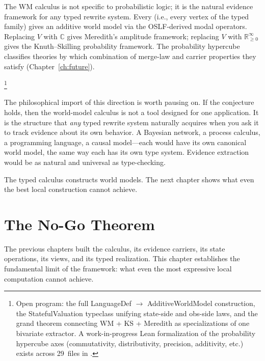 \documentclass[11pt,openany]{report}
\begin{document}
\begin{conjecture}
The WM calculus is not specific to probabilistic logic; it is the
natural evidence framework for any typed rewrite system.  Every
 (i.e., every vertex
of the typed family) gives an additive world model via the
OSLF-derived modal operators.  Replacing $V$ with $\mathbb{C}$ gives
Meredith's amplitude framework; replacing $V$ with
$\mathbb{R}_{\ge 0}^\infty$ gives the Knuth--Skilling probability
framework.  The probability
hypercube~\cite{StayWells2026} classifies theories by which
combination of merge-law and carrier properties they satisfy
(Chapter~\ref{ch:future}).
\end{conjecture}
%
\footnote{Open program: the full LanguageDef $\to$ AdditiveWorldModel
construction, the StatefulValuation typeclass unifying state-side and
obs-side laws, and the grand theorem connecting WM + KS + Meredith as
specializations of one bivariate extractor.  A work-in-progress Lean formalization
of the probability hypercube axes (commutativity, distributivity,
precision, additivity, etc.) exists across 29~files in
.}

The philosophical import of this direction is worth pausing on.
If the conjecture holds, then the world-model calculus is not a
tool designed for one application.  It is the structure that
\emph{any} typed rewrite system naturally acquires when you ask it
to track evidence about its own behavior.  A Bayesian network, a
process calculus, a programming language, a causal model---each
would have its own canonical world model, the same way each has its
own type system.  Evidence extraction would be as natural and
universal as type-checking.

The typed calculus constructs world models.  The next chapter shows
what even the best local construction cannot achieve.


\chapter{The No-Go Theorem}
\label{ch:no-go}

The previous chapters built the calculus, its evidence carriers, its
state operations, its views, and its typed realization.  This chapter
establishes the fundamental limit of the framework: what even the most
expressive local computation cannot achieve.
\end{document}
